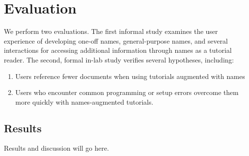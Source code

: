 \section{Evaluation}

We perform two evaluations.
The first informal study examines the user experience of developing one-off \glspl{name}, general-purpose \glspl{name}, and several interactions for accessing additional information through \glspl{name} as a tutorial reader.
The second, formal in-lab study verifies several hypotheses, including:
\noindent
\begin{enumerate}[label=\textbf{H\arabic*.}, ref=H\arabic*, leftmargin=*]
\item Users reference fewer documents when using tutorials augmented with \glspl{name}
\item Users who encounter common programming or setup errors overcome them more quickly with \glspl{name}-augmented tutorials.
\end{enumerate}

\subsection{Results}

Results and discussion will go here.
